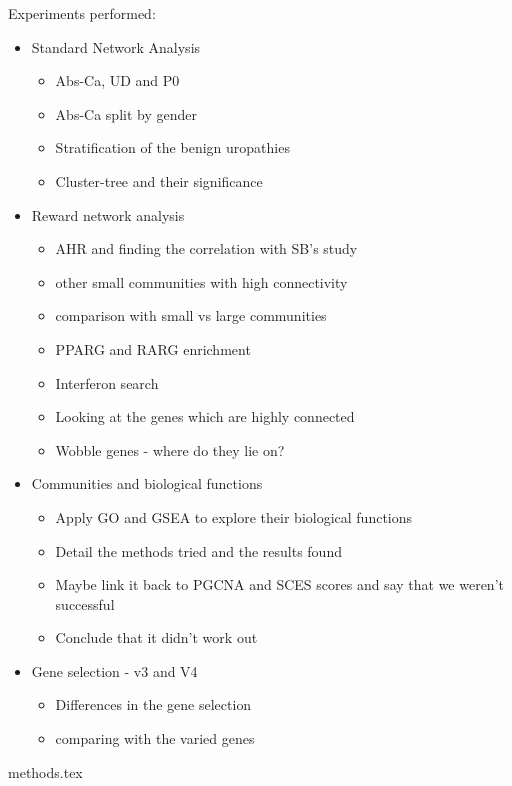 Experiments performed:
\begin{itemize}
    \item Standard Network Analysis
    \begin{itemize}
        \item Abs-Ca, UD and P0
        \item Abs-Ca split by gender
        \item Stratification of the benign uropathies 
        \item Cluster-tree and their significance
    \end{itemize}
  \item Reward network analysis
    \begin{itemize}
        \item AHR and finding the correlation with SB's study
        \item other small communities with high connectivity
        \item comparison with small vs large communities
        \item PPARG and RARG enrichment
        \item Interferon search
        \item Looking at the genes which are highly connected
        \item Wobble genes - where do they lie on?
    \end{itemize}
    \item Communities and biological functions 
    \begin{itemize}
        \item Apply GO and GSEA to explore their biological functions
        \item Detail the methods tried and the results found
        \item Maybe link it back to PGCNA and SCES scores and say that we weren't successful
        \item Conclude that it didn't work out
    \end{itemize}
    \item Gene selection - v3 and V4
    \begin{itemize}
        \item Differences in the gene selection
        \item comparing with the varied genes
    \end{itemize}
\end{itemize}


{methods.tex}

